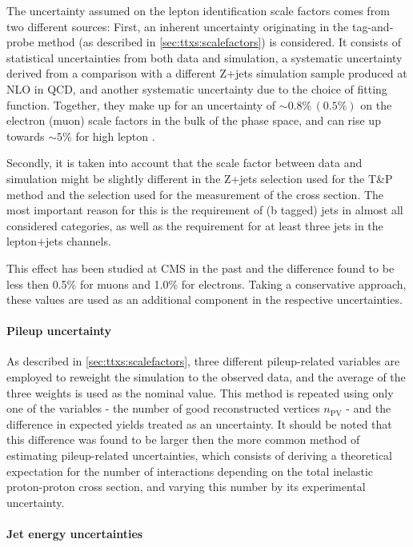 The uncertainty assumed on the lepton identification scale factors comes from two different sources: First, an inherent uncertainty originating in the tag-and-probe method (as described in \cref{sec:ttxs:scalefactors}) is considered. It consists of statistical uncertainties from both data and simulation, a systematic uncertainty derived from a comparison with a different Z+jets simulation sample produced at NLO in QCD, and another systematic uncertainty due to the choice of fitting function. Together, they make up for an uncertainty of $\sim 0.8\% \, (0.5\%)$ on the electron (muon) scale factors in the bulk of the phase space, and can rise up towards $\sim 5\%$ for high lepton \pt.

Secondly, it is taken into account that the scale factor between data and simulation might be slightly different in the Z+jets selection used for the T\&P method and the \ttbar selection used for the measurement of the cross section. The most important reason for this is the requirement of (b tagged) jets in almost all considered categories, as well as the requirement for at least three jets in the lepton+jets channels. 

This effect has been studied at CMS in the past and the difference found to be less then 0.5\% for muons and 1.0\% for electrons. Taking a conservative approach, these values are used as an additional component in the respective uncertainties.

\paragraph{Pileup uncertainty}

As described in \cref{sec:ttxs:scalefactors}, three different pileup-related variables are employed to reweight the simulation to the observed data, and the average of the three weights is used as the nominal value. This method is repeated using only one of the variables - the number of good reconstructed vertices $n_{\mathrm{PV}}$ - and the difference in expected yields treated as an uncertainty. It should be noted that this difference was found to be larger then the more common method of estimating pileup-related uncertainties, which consists of deriving a theoretical expectation for the number of interactions depending on the total inelastic proton-proton cross section, and varying this number by its experimental uncertainty.

\paragraph{Jet energy uncertainties}

